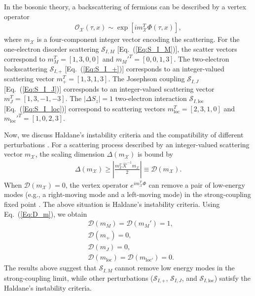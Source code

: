 \documentclass[aps,prx,amsmath,superscriptaddress,twocolumn,bibnotes,longbibliography,floatfix]{revtex4-2}
\begin{document}
	In the bosonic theory, a backscattering of fermions can be described by a vertex operator
	\begin{align}
		\mathcal{O}_{\mathcal{X}}(\tau,x)\sim \exp\left[im_{\mathcal{X}}^T\Phi(\tau,x)\right],
	\end{align}
	where $m_{\mathcal{X}}$ is a four-component integer vector encoding the scattering. For the one-electron disorder scattering $\mathcal{S}_{I,M}$ [Eq.~(\ref{Eq:S_I_M})], the scatter vectors correspond to $m_M^T=[1,3,0,0]$ and $m_M'^T=[0,0,1,3]$. The two-electron backscattering $\mathcal{S}_{I,+}$ [Eq.~(\ref{Eq:S_I_+})] corresponds to an integer-valued scattering vector $m^T_+=[1,3,1,3]$. The Josephson coupling $\mathcal{S}_{I,J}$ [Eq.~(\ref{Eq:S_I_J})] corresponds to an integer-valued scattering vector $m^T_J=[1,3,-1,-3]$. The $|\Delta S_z|=1$ two-electron interaction $\mathcal{S}_{I,\text{loc}}$ [Eq.~(\ref{Eq:S_I_loc})] correspond to scattering vectors $m_{\text{loc}}^T=[2,3,1,0]$ and $m_{\text{loc}}'^T=[1,0,2,3]$.

	Now, we discuss Haldane's instability criteria and the compatibility of different perturbations \cite{HaldaneFDM1995,MooreJE2002,XuC2006}. For a scattering process described by an integer-valued scattering vector $m_{\mathcal{X}}$, the scaling dimension $\Delta(m_{\mathcal{X}})$ is bound by \cite{MooreJE2002,XuC2006,NeupertT2011a,NeupertT2014}
	\begin{align}\label{Eq:D_m}
		\Delta(m_{\mathcal{X}})\ge\left|\frac{m_{\mathcal{X}}^T\hat{\mathcal{K}}^{-1}m_{\mathcal{X}}}{2}\right|\equiv \mathcal{D}(m_{\mathcal{X}}).
	\end{align}
	When $\mathcal{D}(m_{\mathcal{X}})=0$, the vertex operator $e^{im_{\mathcal{X}}^T\Phi}$ can remove a pair of low-energy modes (e.g., a right-moving mode and a left-moving mode) in the strong-coupling fixed point \cite{HaldaneFDM1995,MooreJE2002,XuC2006,NeupertT2011a,NeupertT2014}. The above situation is Haldane's instability criteria. Using Eq.~(\ref{Eq:D_m}), we obtain
	\begin{subequations}
		\begin{align}
			&\mathcal{D}(m_{M})=\mathcal{D}(m_{M}')=1,\\
			&\mathcal{D}(m_{+})=0,\\
			&\mathcal{D}(m_{J})=0,\\
			&\mathcal{D}(m_{\text{loc}})=\mathcal{D}(m_{\text{loc}'})=0.
		\end{align}
	\end{subequations}
	The results above suggest that $\mathcal{S}_{I,M}$ cannot remove low energy modes in the strong-coupling limit, while other perturbations ($\mathcal{S}_{I,+}$, $\mathcal{S}_{I,J}$, and $\mathcal{S}_{I,\text{loc}}$) satisfy the Haldane's instability criteria.
\end{document}
